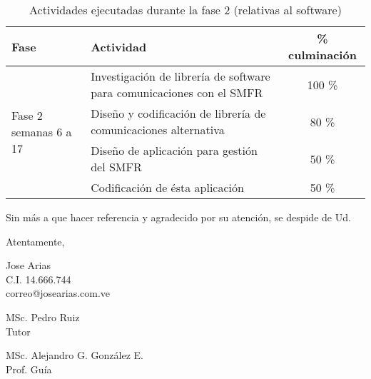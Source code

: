 \documentclass[paper=letter,oneside,fontsize=12pt, parskip=full]{article}
\begin{document}
	\begin{table}[h!]
		\begin{tabularx}{\textwidth}{p{}p{}c}
			\toprule
			{Fase} & 
			{Actividad} & 
			{\% culminación} \\
			\midrule
			\multirow{4}{0.15\textwidth}{Fase 2 \newline \small semanas 6 a 17} &
			Investigación de librería de software para comunicaciones con el SMFR & 100 \% \\
			& Diseño y codificación de librería de comunicaciones alternativa & 80 \% \\
			& Diseño de aplicación para gestión del SMFR & 50 \% \\
			& Codificación de ésta aplicación & 50 \% \\	
			\bottomrule	
		\end{tabularx}
		\caption{Actividades ejecutadas durante la fase 2 (relativas al software)}
	\end{table}	

	Sin más a que hacer referencia y agradecido por su atención, se despide de Ud.	
	
	\begin{flushright}
		Atentamente, 			
	
		\vspace{0.5cm}
		
		\begin{singlespace}
			\large
			Jose Arias \\
			{
				\small
				C.I. 14.666.744 \\
				correo@josearias.com.ve \\			
			}	
		\end{singlespace}
	
	\end{flushright}


	\vspace{1.9cm}

	\hfill
	\begin{minipage}{0.4\textwidth}
		\centering 
		\large
		MSc. Pedro Ruiz \\
		\small
		Tutor
	\end{minipage}%
	\hfill 
	\begin{minipage}{0.4\textwidth}
		\centering \large
		MSc. Alejandro G. González E.	\\	
		\small
		Prof. Guía
	\end{minipage}%
	\hfill 
\end{document}
